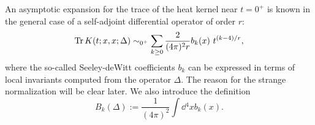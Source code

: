 

An asymptotic expansion for the trace of the heat kernel near $t=0^+$ is known in the general case of a self-adjoint differential operator of order $r$:
\begin{equation}\label{hk-asymptotics}
\operatorname{Tr} K( t ; x , x ; \Delta) 
	\sim_{0^+}
\sum_{k\geq 0} \frac{2}{(4\pi)^2 r} b_k(x) \ t^{{(k-4)}/{r}},
\end{equation}
where the so-called Seeley-deWitt coefficients $b_k$ can be expressed in terms of local invariants computed from the operator $\Delta$. The reason for the strange normalization will be clear later.
We also introduce the definition
\begin{equation}
B_k( \Delta)
	:=
\frac{1}{(4\pi)^2}
\int \dd{^4x}  b_k(x).
\end{equation}


